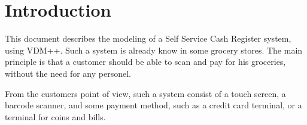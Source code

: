 \chapter{Introduction}
This document describes the modeling of a Self Service Cash Register system, using VDM++.
Such a system is already know in some grocery stores. 
The main principle is that a customer should be able to scan and pay for his groceries, without the need for any personel.

From the customers point of view, such a system consist of a touch screen, a barcode scanner, and some payment method, such as a credit card terminal, or a terminal for coins and bills.